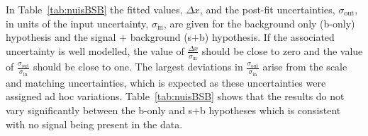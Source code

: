 
In Table~\ref{tab:nuisBSB} the fitted values, $\Delta x$, and the post-fit uncertainties, $\sigma_{\text{out}}$, in units of the input uncertainty, $\sigma_{\text{in}}$, are given for the background only (b-only) hypothesis and the signal + background (s+b) hypothesis. If the associated uncertainty is well modelled, the value of $\frac{\Delta x}{\sigma_{\text{in}}}$ should be close to zero and the value of $\frac{\sigma_{\text{out}}}{\sigma_{\text{in}}}$ should be close to one. The largest deviations in $\frac{\sigma_{\text{out}}}{\sigma_{\text{in}}}$ arise from the scale and matching uncertainties, which is expected as these uncertainties were assigned ad hoc variations. Table~\ref{tab:nuisBSB} shows that the results do not vary significantly between the b-only and s+b hypotheses which is consistent with no signal being present in the data.

